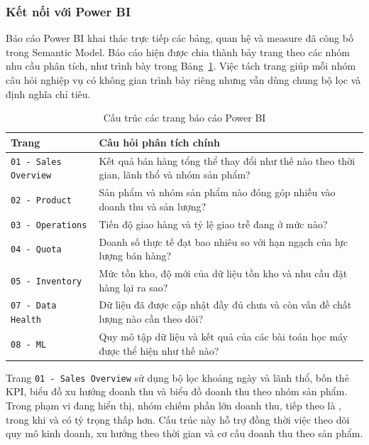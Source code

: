
\subsubsection{Kết nối với Power BI}

Báo cáo Power BI khai thác trực tiếp các bảng, quan hệ và measure đã công bố trong Semantic Model. Báo cáo hiện được chia thành bảy trang theo các nhóm nhu cầu phân tích, như trình bày trong Bảng~\ref{tab:powerbi-pages}. Việc tách trang giúp mỗi nhóm câu hỏi nghiệp vụ có không gian trình bày riêng nhưng vẫn dùng chung bộ lọc và định nghĩa chỉ tiêu.

\begin{table}[H]\centering
\caption{Cấu trúc các trang báo cáo Power BI}
\label{tab:powerbi-pages}
\begin{tabularx}{\textwidth}{|p{4.2cm}|X|}\hline
\textbf{Trang} & \textbf{Câu hỏi phân tích chính} \\ \hline
\texttt{01 - Sales Overview} & Kết quả bán hàng tổng thể thay đổi như thế nào theo thời gian, lãnh thổ và nhóm sản phẩm? \\ \hline
\texttt{02 - Product} & Sản phẩm và nhóm sản phẩm nào đóng góp nhiều vào doanh thu và sản lượng? \\ \hline
\texttt{03 - Operations} & Tiến độ giao hàng và tỷ lệ giao trễ đang ở mức nào? \\ \hline
\texttt{04 - Quota} & Doanh số thực tế đạt bao nhiêu so với hạn ngạch của lực lượng bán hàng? \\ \hline
\texttt{05 - Inventory} & Mức tồn kho, độ mới của dữ liệu tồn kho và nhu cầu đặt hàng lại ra sao? \\ \hline
\texttt{07 - Data Health} & Dữ liệu đã được cập nhật đầy đủ chưa và còn vấn đề chất lượng nào cần theo dõi? \\ \hline
\texttt{08 - ML} & Quy mô tập dữ liệu và kết quả của các bài toán học máy được thể hiện như thế nào? \\ \hline
\end{tabularx}
\end{table}

Trang \texttt{01 - Sales Overview} sử dụng bộ lọc khoảng ngày và lãnh thổ, bốn thẻ KPI, biểu đồ xu hướng doanh thu và biểu đồ doanh thu theo nhóm sản phẩm. Trong phạm vi đang hiển thị, nhóm  chiếm phần lớn doanh thu, tiếp theo là , trong khi  và  có tỷ trọng thấp hơn. Cấu trúc này hỗ trợ đồng thời việc theo dõi quy mô kinh doanh, xu hướng theo thời gian và cơ cấu doanh thu theo sản phẩm.


